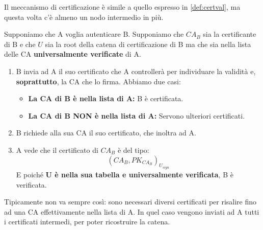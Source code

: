 Il meccanismo di certificazione è simile a quello espresso in \cref{def:certval}, ma questa volta c'è almeno un nodo intermedio in più.
\begin{definition}\label{def:certchain}
Supponiamo che A voglia autenticare B. Supponiamo che \textbf{$CA_B$} sia la certificante di B e che $U$ sia la root della catena di certificazione di B ma che sia nella lista delle CA \textbf{universalmente verificate} di A.
\begin{enumerate}
    \item B invia ad A il suo certificato che A controllerà per individuare la validità e, \textbf{soprattutto}, la CA che lo firma. Abbiamo due casi: 
\begin{itemize}
    \item \textbf{La CA di B è nella lista di A:} B è certificata.
    \item \textbf{La CA di B NON è nella lista di A:} Servono ulteriori certificati.  
\end{itemize}
\item B richiede alla sua CA il suo certificato, che inoltra ad A.
\item A vede che il certificato di $CA_B$ è del tipo: \[(CA_B, PK_{CA_B})_{U_{sign}}\]
E poiché \textbf{U è nella sua tabella e universalmente verificata}, B è verificata.
\end{enumerate}
\end{definition}
\begin{note}
Tipicamente non va sempre così: sono necessari diversi certificati per risalire fino ad una CA effettivamente nella lista di A. In quel caso vengono inviati ad A tutti i certificati intermedi, per poter ricostruire la catena. 
\end{note}
